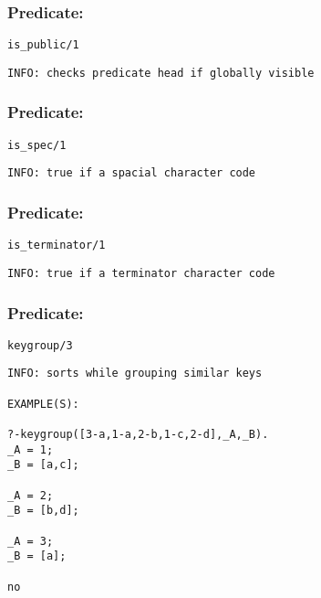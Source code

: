 \subsubsection{Predicate:} \label{isV95WpublicV95W1}

\begin{verbatim}
is_public/1
\end{verbatim}

{\small \begin{verbatim}
INFO: checks predicate head if globally visible

\end{verbatim}}

\subsubsection{Predicate:} \label{isV95WspecV95W1}

\begin{verbatim}
is_spec/1
\end{verbatim}

{\small \begin{verbatim}
INFO: true if a spacial character code

\end{verbatim}}

\subsubsection{Predicate:} \label{isV95WterminatorV95W1}

\begin{verbatim}
is_terminator/1
\end{verbatim}

{\small \begin{verbatim}
INFO: true if a terminator character code

\end{verbatim}}

\subsubsection{Predicate:} \label{keygroupV95W3}

\begin{verbatim}
keygroup/3
\end{verbatim}

{\small \begin{verbatim}
INFO: sorts while grouping similar keys

EXAMPLE(S):

?-keygroup([3-a,1-a,2-b,1-c,2-d],_A,_B).
_A = 1;
_B = [a,c];

_A = 2;
_B = [b,d];

_A = 3;
_B = [a];

no

\end{verbatim}}
